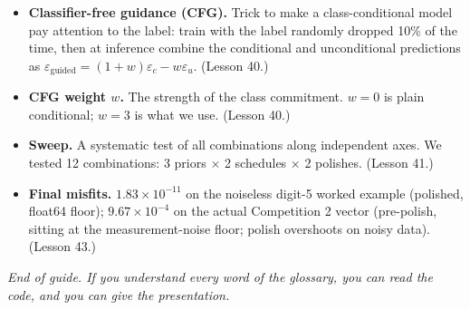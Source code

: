 \documentclass[11pt]{article}
\begin{document}
\begin{itemize}[leftmargin=2em]
  each training image. (Lesson 40.)
\item \textbf{Classifier-free guidance (CFG).} Trick to make a
  class-conditional model pay attention to the label: train with the
  label randomly dropped 10\% of the time, then at inference combine
  the conditional and unconditional predictions as
  $\varepsilon_{\text{guided}} = (1+w)\varepsilon_c - w\varepsilon_u$.
  (Lesson 40.)
\item \textbf{CFG weight $w$.} The strength of the class commitment.
  $w=0$ is plain conditional; $w=3$ is what we use. (Lesson 40.)
\item \textbf{Sweep.} A systematic test of all combinations along
  independent axes. We tested 12 combinations: 3 priors $\times$ 2
  schedules $\times$ 2 polishes. (Lesson 41.)
\item \textbf{Final misfits.} $1.83 \times 10^{-11}$ on the noiseless
  digit-5 worked example (polished, float64 floor); $9.67 \times
  10^{-4}$ on the actual Competition 2 vector (pre-polish, sitting at
  the measurement-noise floor; polish overshoots on noisy data).
  (Lesson 43.)
\end{itemize}

\bigskip

\noindent\textit{End of guide. If you understand every word of the
glossary, you can read the code, and you can give the presentation.}
\end{document}
